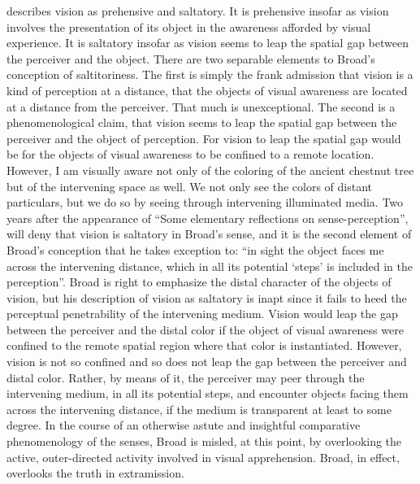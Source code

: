 \citet{Broad:1952kx} describes vision as prehensive and saltatory. It is prehensive insofar as vision involves the presentation of its object in the awareness afforded by visual experience. It is saltatory insofar as vision seems to leap the spatial gap between the perceiver and the object. There are two separable elements to Broad's conception of saltitoriness. The first is simply the frank admission that vision is a kind of perception at a distance, that the objects of visual awareness are located at a distance from the perceiver. That much is unexceptional. The second is a phenomenological claim, that vision seems to leap the spatial gap between the perceiver and the object of perception. For vision to leap the spatial gap would be for the objects of visual awareness to be confined to a remote location. However, I am visually aware not only of the coloring of the ancient chestnut tree but of the intervening space as well. We not only see the colors of distant particulars, but we do so by seeing through intervening illuminated media. Two years after the appearance of ``Some elementary reflections on sense-perception'', \citet[518]{Jonas:1954aa} will deny that vision is saltatory in Broad’s sense, and it is the second element of Broad's conception that he takes exception to: ``in sight the object faces me across the intervening distance, which in all its potential `steps' is included in the perception''. Broad is right to emphasize the distal character of the objects of vision, but his description of vision as saltatory is inapt since it fails to heed the perceptual penetrability of the intervening medium. Vision would leap the gap between the perceiver and the distal color if the object of visual awareness were confined to the remote spatial region where that color is instantiated. However, vision is not so confined and so does not leap the gap between the perceiver and distal color. Rather, by means of it, the perceiver may peer through the intervening medium, in all its potential steps, and encounter objects facing them across the intervening distance, if the medium is transparent at least to some degree. In the course of an otherwise astute and insightful comparative phenomenology of the senses, Broad is misled, at this point, by overlooking the active, outer-directed activity involved in visual apprehension. Broad, in effect, overlooks the truth in extramission.


